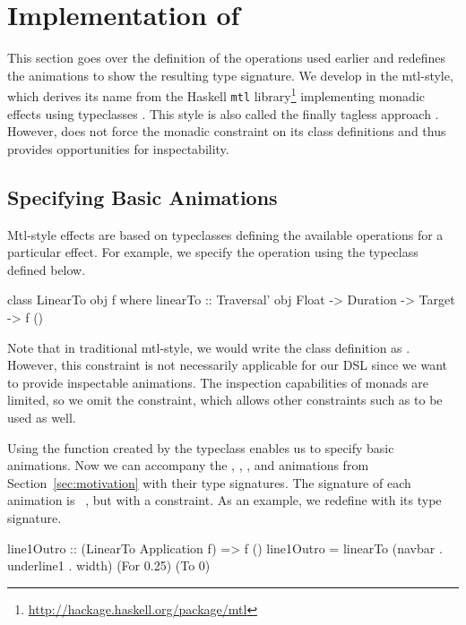 \section{Implementation of \dsl{}}
\label{sec:detail}

This section goes over the definition of the operations used earlier and redefines the animations to show the resulting type signature. We develop \dsl{} in the mtl-style, which derives its name from the Haskell \texttt{mtl} library\footnote{\url{http://hackage.haskell.org/package/mtl}} implementing monadic effects using typeclasses \cite{DBLP:conf/afp/Jones95}. This style is also called the finally tagless approach \cite{DBLP:journals/jfp/CaretteKS09}. However, \dsl{} does not force the monadic constraint on its class definitions and thus provides opportunities for inspectability.

\subsection{Specifying Basic Animations}

Mtl-style effects are based on typeclasses defining the available operations for a particular effect. For example, we specify the  operation using the  typeclass defined below.

\begin{code}
class LinearTo obj f where
  linearTo :: Traversal' obj Float -> Duration -> Target -> f ()
\end{code}

Note that in traditional mtl-style, we would write the class definition as . However, this constraint is not necessarily applicable for our DSL since we want to provide inspectable animations. The inspection capabilities of monads are limited, so we omit the  constraint, which allows other constraints such as  to be used as well.

Using the  function created by the  typeclass enables us to specify basic animations. Now we can accompany the , , , and  animations from Section~\ref{sec:motivation} with their type signatures. The signature of each animation is ~\hs{()}, but with a  constraint. As an example, we redefine  with its type signature. 

\begin{code}
line1Outro :: (LinearTo Application f) => f ()
line1Outro = linearTo (navbar . underline1 . width) (For 0.25) (To 0)
\end{code}

